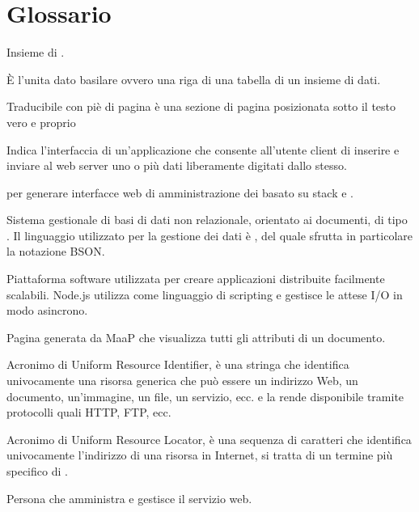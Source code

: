 \clearpage
\section{Glossario}


	Insieme di .


	\`E l'unita dato basilare ovvero una riga di una tabella di un insieme di dati.


Traducibile con piè di pagina è una sezione di pagina posizionata sotto il testo vero e proprio

	Indica l'interfaccia di un'applicazione che consente all'utente client di inserire e inviare al web server uno o più dati liberamente digitati dallo stesso. 
	

 per generare interfacce web di amministrazione dei  basato su stack  e .


Sistema gestionale di basi di dati non relazionale, orientato ai documenti, di tipo . Il linguaggio utilizzato per la gestione dei dati è , del quale sfrutta in particolare la notazione BSON.


Piattaforma software utilizzata per creare applicazioni distribuite facilmente scalabili.
Node.js utilizza  come linguaggio di scripting e gestisce le attese I/O in modo asincrono.


Pagina generata da MaaP che visualizza tutti gli attributi di un documento.


Acronimo di Uniform Resource Identifier, è una stringa che identifica univocamente una risorsa generica che può essere un indirizzo Web, un documento, un'immagine, un file, un servizio, ecc. e la rende disponibile tramite protocolli quali HTTP, FTP, ecc.

Acronimo di Uniform Resource Locator,  è una sequenza di caratteri che identifica univocamente l'indirizzo di una risorsa in Internet, si tratta di un termine più specifico di .


	Persona che amministra e gestisce il servizio web.


